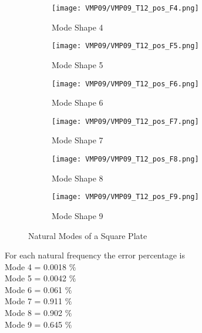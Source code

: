 \documentclass[VM.tex]{subfiles}
\begin{document}
\begin{figure}[h!]
\begin{subfigure}{.3\textwidth}
\texttt{[image: VMP09/VMP09\_T12\_pos\_F4.png]}
\caption{Mode Shape 4}
\end{subfigure} \hfill
\begin{subfigure}{.3\textwidth}
\texttt{[image: VMP09/VMP09\_T12\_pos\_F5.png]}
\caption{Mode Shape 5}
\end{subfigure}\hfill
\begin{subfigure}{.3\textwidth}
\texttt{[image: VMP09/VMP09\_T12\_pos\_F6.png]}
\caption{Mode Shape 6}
\end{subfigure}\vfill
\begin{subfigure}{.3\textwidth}
\texttt{[image: VMP09/VMP09\_T12\_pos\_F7.png]}
\caption{Mode Shape 7}
\end{subfigure} \hfill
\begin{subfigure}{.3\textwidth}
\texttt{[image: VMP09/VMP09\_T12\_pos\_F8.png]}
\caption{Mode Shape 8}
\end{subfigure}\hfill
\begin{subfigure}{.3\textwidth}
\texttt{[image: VMP09/VMP09\_T12\_pos\_F9.png]}
\caption{Mode Shape 9}
\end{subfigure}
\caption{Natural Modes of a Square Plate}
\end{figure}

For each natural frequency the error percentage is \\
Mode 4 =  0.0018 $\%$ \\
Mode 5 =  0.0042 $\%$ \\
Mode 6 =  0.061 $\%$ \\ 
Mode 7 =  0.911 $\%$ \\
Mode 8 =  0.902 $\%$ \\
Mode 9 =  0.645 $\%$ \\




\begin{comment}

\end{comment}
\end{document}
